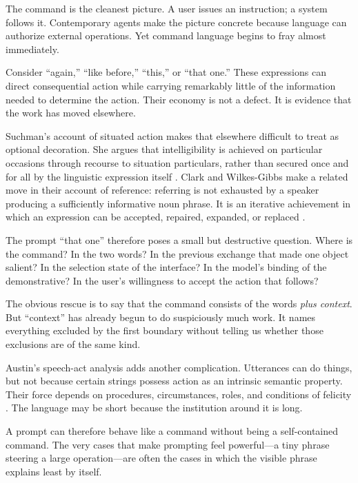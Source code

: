 \documentclass[11pt]{article}
\begin{document}
The command is the cleanest picture. A user issues an instruction; a system follows it. Contemporary agents make the picture concrete because language can authorize external operations. Yet command language begins to fray almost immediately.

Consider ``again,'' ``like before,'' ``this,'' or ``that one.'' These expressions can direct consequential action while carrying remarkably little of the information needed to determine the action. Their economy is not a defect. It is evidence that the work has moved elsewhere.

Suchman's account of situated action makes that elsewhere difficult to treat as optional decoration. She argues that intelligibility is achieved on particular occasions through recourse to situation particulars, rather than secured once and for all by the linguistic expression itself \parencite{suchman1985plans}. Clark and Wilkes-Gibbs make a related move in their account of reference: referring is not exhausted by a speaker producing a sufficiently informative noun phrase. It is an iterative achievement in which an expression can be accepted, repaired, expanded, or replaced \parencite{clarkwilkesgibbs1986}.

The prompt ``that one'' therefore poses a small but destructive question. Where is the command? In the two words? In the previous exchange that made one object salient? In the selection state of the interface? In the model's binding of the demonstrative? In the user's willingness to accept the action that follows?

The obvious rescue is to say that the command consists of the words \emph{plus context}. But ``context'' has already begun to do suspiciously much work. It names everything excluded by the first boundary without telling us whether those exclusions are of the same kind.

Austin's speech-act analysis adds another complication. Utterances can do things, but not because certain strings possess action as an intrinsic semantic property. Their force depends on procedures, circumstances, roles, and conditions of felicity \parencite{austin1962how}. The language may be short because the institution around it is long.

A prompt can therefore behave like a command without being a self-contained command. The very cases that make prompting feel powerful---a tiny phrase steering a large operation---are often the cases in which the visible phrase explains least by itself.
\end{document}
